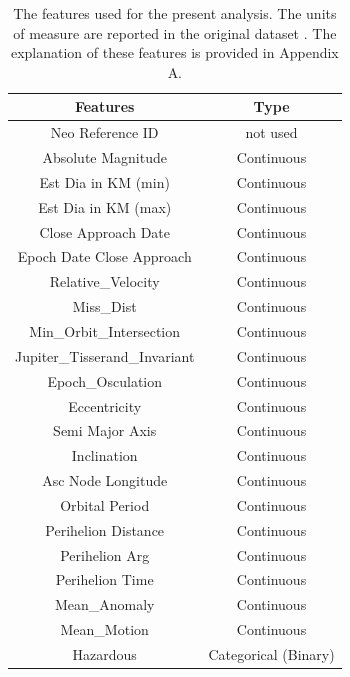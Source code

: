 \documentclass[12pt,%
               a4paper,%
               oneside,openany,%
               titlepage,%
               headinclude,footinclude,%
               BCOR5mm,%
               cleardoublepage=empty,%
               tablecaptionabove,%
               floatperchapter,
               ]{scrreprt}                 %
\begin{document}
\begin{table}[]
\caption{The features used for the present analysis. The units of measure are reported in the original dataset \cite{kaggle_dataset}. The explanation of these features is provided in Appendix A. }
\begin{center}
\begin{tabular}{c|c}
\hline
\textbf{Features}             & \textbf{Type}        \\ \hline
Neo Reference ID              & not used             \\ \hline
Absolute Magnitude            & Continuous           \\ \hline
Est Dia in KM (min)           & Continuous           \\ \hline
Est Dia in KM (max)           & Continuous           \\ \hline
Close Approach Date           & Continuous           \\ \hline
Epoch Date Close Approach     & Continuous           \\ \hline
Relative\_Velocity            & Continuous           \\ \hline
Miss\_Dist                    & Continuous           \\ \hline
Min\_Orbit\_Intersection      & Continuous           \\ \hline
Jupiter\_Tisserand\_Invariant & Continuous           \\ \hline
Epoch\_Osculation             & Continuous           \\ \hline
Eccentricity                  & Continuous           \\ \hline
Semi Major Axis               & Continuous           \\ \hline
Inclination                   & Continuous           \\ \hline
Asc Node Longitude            & Continuous           \\ \hline
Orbital Period                & Continuous           \\ \hline
Perihelion Distance           & Continuous           \\ \hline
Perihelion Arg                & Continuous           \\ \hline
Perihelion Time               & Continuous           \\ \hline
Mean\_Anomaly                 & Continuous           \\ \hline
Mean\_Motion                  & Continuous           \\ \hline
Hazardous                     & Categorical (Binary)
\end{tabular}
\end{center}
\label{tab_features}
\end{table}
\end{document}
